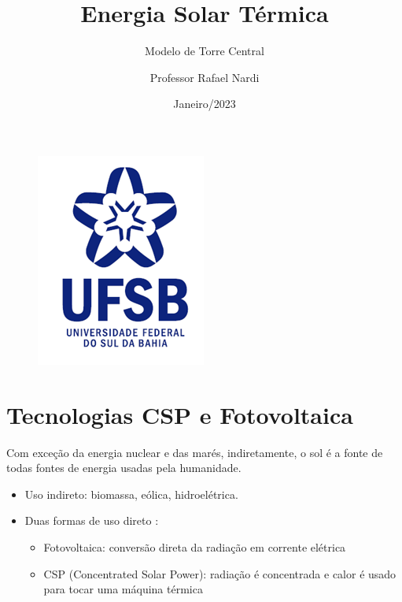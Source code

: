 \documentclass[12pt,notheorems,hyperref={pdfauthor= Rafael Nardi}]{beamer}
\title{Energia Solar Térmica}
\subtitle{Modelo de Torre Central}
\author{Professor Rafael Nardi}
\institute{UFSB}
\date{Janeiro/2023}
\begin{document}
{
\begin{frame}%
  \titlepage
	\begin{figure}[b]
		\centering
		\includegraphics[scale=0.5]{./logo_ufsb.png}
	\end{figure}
\end{frame}
}

\addtocounter{framenumber}{-1}

\section{Tecnologias CSP e Fotovoltaica}

\begin{frame}%

	Com exceção da energia nuclear e das marés, indiretamente, o sol é a fonte de todas
	fontes de energia usadas pela humanidade. \pause

	\bigskip

	\begin{itemize}
			\item Uso indireto: biomassa, eólica, hidroelétrica.
	\end{itemize} \pause

	\bigskip

	\begin{itemize}
		\item Duas formas de uso direto :
			\medskip
		\begin{itemize}
			\item Fotovoltaica: conversão direta da radiação em corrente elétrica \pause
			\medskip
			\item CSP (Concentrated Solar Power): radiação é concentrada e calor é usado para tocar uma máquina térmica
		\end{itemize}

	\end{itemize}

\end{frame}
\end{document}
